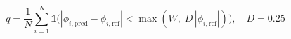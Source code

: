 \documentclass[12pt]{article}
\begin{document}
\begin{equation*}
q = \frac{1}{N}\sum_{i=1}^{N} \mathbb{1}\!\bigl(|\phi_{i,\text{pred}} - \phi_{i,\text{ref}}| < \max(W,\; D\,|\phi_{i,\text{ref}}|)\bigr), \quad D = 0.25
\end{equation*}
\end{document}

